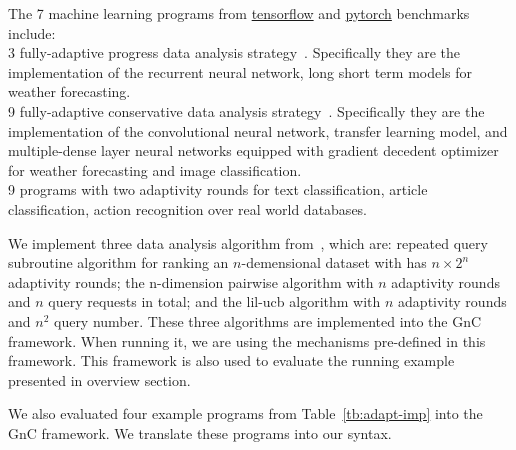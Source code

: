 The 7 machine learning programs
from \hyperlink{https://github.com/tensorflow/tensorflow/tree/master/tensorflow/examples}{tensorflow}
and \hyperlink{https://github.com/pytorch/pytorch}{pytorch}
benchmarks include:
\\
3 fully-adaptive progress data analysis
strategy~\cite{ZrnicH19}.
Specifically they are the implementation of the recurrent neural network, long short term models for 
weather forecasting.
\\
9
fully-adaptive conservative data analysis
strategy~\cite{ZrnicH19}.
Specifically they are the implementation of the convolutional neural network, transfer learning model,
and multiple-dense layer neural networks equipped with gradient decedent optimizer for
weather forecasting and image classification.
\\
9 programs with two adaptivity rounds for text classification,
article classification, action recognition over real world databases.

We implement three data analysis algorithm from~\cite{Jamieson2015TheAO},
which are:
repeated query subroutine algorithm for ranking
an $n$-demensional dataset with
has $n\times 2^n$ adaptivity rounds;
the n-dimension pairwise algorithm with $n$ adaptivity rounds and $n$ query requests in total;
and the lil-ucb algorithm with $n$ adaptivity rounds and $n^2$ query number.
These three algorithms are implemented into the GnC framework.
When running it, we are using the mechanisms pre-defined in this framework.
This framework is also used to evaluate the running example presented in overview section.

We also evaluated four example programs from Table~\ref{tb:adapt-imp} into the GnC framework.
We translate these programs into our syntax.






% 